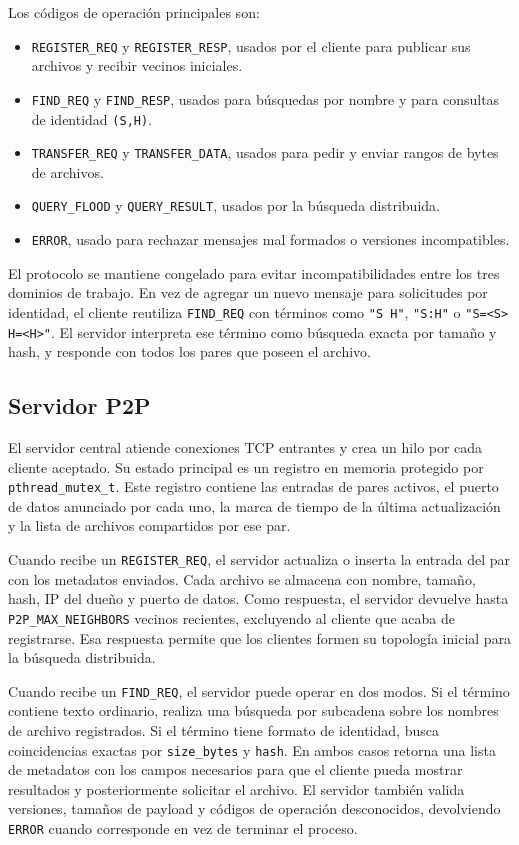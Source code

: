 \documentclass[12pt]{article}
\begin{document}
Los códigos de operación principales son:

\begin{itemize}
    \item \texttt{REGISTER\_REQ} y \texttt{REGISTER\_RESP}, usados por el
    cliente para publicar sus archivos y recibir vecinos iniciales.
    \item \texttt{FIND\_REQ} y \texttt{FIND\_RESP}, usados para búsquedas por
    nombre y para consultas de identidad \texttt{(S,H)}.
    \item \texttt{TRANSFER\_REQ} y \texttt{TRANSFER\_DATA}, usados para pedir y
    enviar rangos de bytes de archivos.
    \item \texttt{QUERY\_FLOOD} y \texttt{QUERY\_RESULT}, usados por la
    búsqueda distribuida.
    \item \texttt{ERROR}, usado para rechazar mensajes mal formados o versiones
    incompatibles.
\end{itemize}

El protocolo se mantiene congelado para evitar incompatibilidades entre los
tres dominios de trabajo. En vez de agregar un nuevo mensaje para solicitudes
por identidad, el cliente reutiliza \texttt{FIND\_REQ} con términos como
\verb|"S H"|, \verb|"S:H"| o \verb|"S=<S> H=<H>"|. El servidor interpreta
ese término como búsqueda exacta por tamaño y hash, y responde con todos los
pares que poseen el archivo.

\subsection{Servidor P2P}

El servidor central atiende conexiones TCP entrantes y crea un hilo por cada
cliente aceptado. Su estado principal es un registro en memoria protegido por
\texttt{pthread\_mutex\_t}. Este registro contiene las entradas de pares
activos, el puerto de datos anunciado por cada uno, la marca de tiempo de la
última actualización y la lista de archivos compartidos por ese par.

Cuando recibe un \texttt{REGISTER\_REQ}, el servidor actualiza o inserta la
entrada del par con los metadatos enviados. Cada archivo se almacena con nombre,
tamaño, hash, IP del dueño y puerto de datos. Como respuesta, el servidor
devuelve hasta \texttt{P2P\_MAX\_NEIGHBORS} vecinos recientes, excluyendo al
cliente que acaba de registrarse. Esa respuesta permite que los clientes formen
su topología inicial para la búsqueda distribuida.

Cuando recibe un \texttt{FIND\_REQ}, el servidor puede operar en dos modos. Si
el término contiene texto ordinario, realiza una búsqueda por subcadena sobre
los nombres de archivo registrados. Si el término tiene formato de identidad,
busca coincidencias exactas por \texttt{size\_bytes} y \texttt{hash}. En ambos
casos retorna una lista de metadatos con los campos necesarios para que el
cliente pueda mostrar resultados y posteriormente solicitar el archivo. El
servidor también valida versiones, tamaños de payload y códigos de operación
desconocidos, devolviendo \texttt{ERROR} cuando corresponde en vez de terminar
el proceso.
\end{document}
